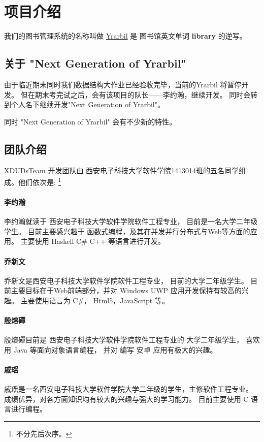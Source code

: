 

\section*{项目介绍}
我们的图书管理系统的名称叫做 \href{http://yrarbil.iok.la}{Yrarbil} 是 图书馆英文单词 \textbf{library} 的逆写。

\subsection*{关于 "Next Generation of Yrarbil"}
由于临近期末同时我们数据结构大作业已经验收完毕，当前的Yrarbil 将暂停开发。
但在期末考完试之后，会有该项目的队长——李约瀚，继续开发。
同时会转到个人名下继续开发"Next Generation of Yrarbil"。

同时 "Next Generation of Yrarbil" 会有不少新的特性。 

\subsection*{团队介绍}
XDUDsTeam 开发团队由 西安电子科技大学软件学院1413014班的五名同学组成。他们依次是: 
\footnote{不分先后次序。}

\paragraph{李约瀚} 
李约瀚就读于 西安电子科技大学软件学院软件工程专业，
目前是一名大学二年级学生。
目前主要感兴趣于 函数式编程，及其在并发并行分布式与Web等方面的应用。
主要使用 Haskell C\# C++ 等语言进行开发。

\paragraph{乔新文} 
乔新文是西安电子科技大学软件学院软件工程专业，
目前的大学二年级学生。
目前主要目标在于Web前端部分，并对 Windows UWP 应用开发保持有较高的兴趣。
主要使用语言为 C\#， Html5，JavaScript 等。

\paragraph{殷熔磾}
殷熔磾目前是 西安电子科技大学软件学院软件工程专业的 大学二年级学生，
喜欢用 Java 等面向对象语言编程，
并对 编写 安卓 应用有极大的兴趣。

\paragraph{戚瑶}
戚瑶是一名西安电子科技大学软件学院大学二年级的学生，主修软件工程专业。
成绩优异，对各方面知识均有较大的兴趣与强大的学习能力。
目前主要使用 C 语言进行编程。

